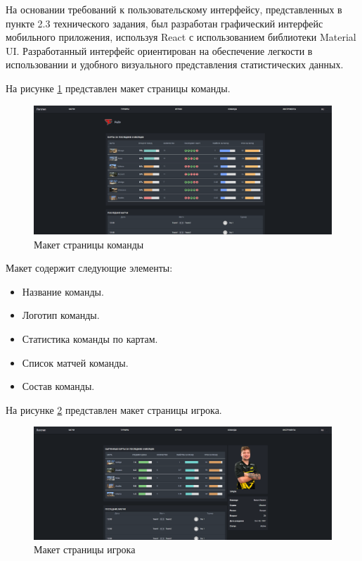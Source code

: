На основании требований к пользовательскому интерфейсу, представленных в пункте 2.3 технического задания, был разработан графический интерфейс мобильного приложения, используя React с использованием библиотеки Material UI. Разработанный интерфейс ориентирован на обеспечение легкости в использовании и удобного визуального представления статистических данных.

На рисунке \ref{fig:-teamPage} представлен макет страницы команды.
\begin{figure}
	\centering
	\includegraphics[width=0.95\linewidth]{"images/Страница команды"}
	\caption{Макет страницы команды}
	\label{fig:-teamPage}
\end{figure}

Макет содержит следующие элементы:
\begin{itemize}
	\item Название команды.
	\item Логотип команды.
	\item Статистика команды по картам.
	\item Список матчей команды.
	\item Состав команды.
\end{itemize}

На рисунке \ref{fig:-playerPage} представлен макет страницы игрока.
\begin{figure}
	\centering
	\includegraphics[width=0.95\linewidth]{"images/Страница игрока"}
	\caption{Макет страницы игрока}
	\label{fig:-playerPage}
\end{figure}

